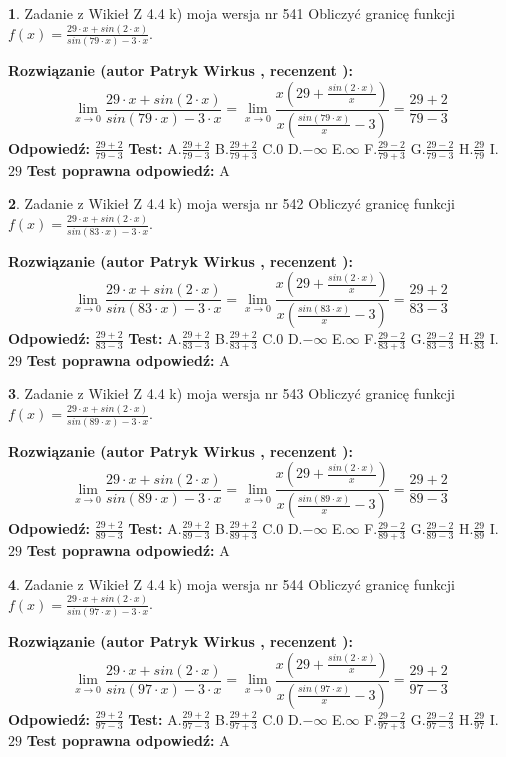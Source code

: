 \documentclass[12pt, a4paper]{article}
\theoremstyle{definition} %
\newtheorem{zad}{}
\newcommand{\zadStart}[1]{\begin{zad}#1\newline}
\newcommand{\zadStop}{\end{zad}}
\newcommand{\rozwStart}[2]{\noindent \textbf{Rozwiązanie (autor #1 , recenzent #2): }\newline}
\newcommand{\rozwStop}{\newline}
\newcommand{\odpStart}{\noindent \textbf{Odpowiedź:}\newline}
\newcommand{\odpStop}{\newline}
\newcommand{\testStart}{\noindent \textbf{Test:}\newline}
\newcommand{\testStop}{\newline}
\newcommand{\kluczStart}{\noindent \textbf{Test poprawna odpowiedź:}\newline}
\newcommand{\kluczStop}{\newline}
\begin{document}
\zadStart{Zadanie z Wikieł Z 4.4 k) moja wersja nr 541}
Obliczyć granicę funkcji $f(x)=\frac{29\cdot x +sin(2\cdot x)}{sin(79\cdot x) -3\cdot x}$.
\zadStop
\rozwStart{Patryk Wirkus}{}
$$\lim\limits_{x\to 0}\frac{29\cdot x +sin(2\cdot x)}{sin(79\cdot x) -3\cdot x}
=\lim\limits_{x\to 0}\frac{x(29+\frac{sin(2\cdot x)}{x})}{x(\frac{sin(79\cdot x)}{x}-3)}
=\frac{29+2}{79-3}$$
\rozwStop
\odpStart
$\frac{29+2}{79-3}$
\odpStop
\testStart
A.$\frac{29+2}{79-3}$
B.$\frac{29+2}{79+3}$
C.$0$
D.$-\infty$
E.$\infty$
F.$\frac{29-2}{79+3}$
G.$\frac{29-2}{79-3}$
H.$\frac{29}{79}$
I.$29$
\testStop
\kluczStart
A
\kluczStop



\zadStart{Zadanie z Wikieł Z 4.4 k) moja wersja nr 542}
Obliczyć granicę funkcji $f(x)=\frac{29\cdot x +sin(2\cdot x)}{sin(83\cdot x) -3\cdot x}$.
\zadStop
\rozwStart{Patryk Wirkus}{}
$$\lim\limits_{x\to 0}\frac{29\cdot x +sin(2\cdot x)}{sin(83\cdot x) -3\cdot x}
=\lim\limits_{x\to 0}\frac{x(29+\frac{sin(2\cdot x)}{x})}{x(\frac{sin(83\cdot x)}{x}-3)}
=\frac{29+2}{83-3}$$
\rozwStop
\odpStart
$\frac{29+2}{83-3}$
\odpStop
\testStart
A.$\frac{29+2}{83-3}$
B.$\frac{29+2}{83+3}$
C.$0$
D.$-\infty$
E.$\infty$
F.$\frac{29-2}{83+3}$
G.$\frac{29-2}{83-3}$
H.$\frac{29}{83}$
I.$29$
\testStop
\kluczStart
A
\kluczStop



\zadStart{Zadanie z Wikieł Z 4.4 k) moja wersja nr 543}
Obliczyć granicę funkcji $f(x)=\frac{29\cdot x +sin(2\cdot x)}{sin(89\cdot x) -3\cdot x}$.
\zadStop
\rozwStart{Patryk Wirkus}{}
$$\lim\limits_{x\to 0}\frac{29\cdot x +sin(2\cdot x)}{sin(89\cdot x) -3\cdot x}
=\lim\limits_{x\to 0}\frac{x(29+\frac{sin(2\cdot x)}{x})}{x(\frac{sin(89\cdot x)}{x}-3)}
=\frac{29+2}{89-3}$$
\rozwStop
\odpStart
$\frac{29+2}{89-3}$
\odpStop
\testStart
A.$\frac{29+2}{89-3}$
B.$\frac{29+2}{89+3}$
C.$0$
D.$-\infty$
E.$\infty$
F.$\frac{29-2}{89+3}$
G.$\frac{29-2}{89-3}$
H.$\frac{29}{89}$
I.$29$
\testStop
\kluczStart
A
\kluczStop



\zadStart{Zadanie z Wikieł Z 4.4 k) moja wersja nr 544}
Obliczyć granicę funkcji $f(x)=\frac{29\cdot x +sin(2\cdot x)}{sin(97\cdot x) -3\cdot x}$.
\zadStop
\rozwStart{Patryk Wirkus}{}
$$\lim\limits_{x\to 0}\frac{29\cdot x +sin(2\cdot x)}{sin(97\cdot x) -3\cdot x}
=\lim\limits_{x\to 0}\frac{x(29+\frac{sin(2\cdot x)}{x})}{x(\frac{sin(97\cdot x)}{x}-3)}
=\frac{29+2}{97-3}$$
\rozwStop
\odpStart
$\frac{29+2}{97-3}$
\odpStop
\testStart
A.$\frac{29+2}{97-3}$
B.$\frac{29+2}{97+3}$
C.$0$
D.$-\infty$
E.$\infty$
F.$\frac{29-2}{97+3}$
G.$\frac{29-2}{97-3}$
H.$\frac{29}{97}$
I.$29$
\testStop
\kluczStart
A
\kluczStop
\end{document}
